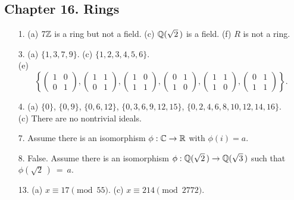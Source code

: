 \subsection*{Chapter 16. Rings}
 
{\small
\begin{itemize}
 
\item[1.]
(a) $7 {\Bbb Z}$ is a ring but not a field.
(c) ${\Bbb Q}(\sqrt{2}\, )$ is a field.
(f) $R$ is not a ring.
 
 
\item[3.]
(a) $\{1, 3, 7, 9 \}$.
(c) $\{ 1, 2, 3, 4, 5, 6 \}$. \\
(e) 
\[
\left\{
\begin{pmatrix}
1 & 0 \\
0 & 1
\end{pmatrix},
\begin{pmatrix}
1 & 1 \\
0 & 1
\end{pmatrix},
\begin{pmatrix}
1 & 0 \\
1 & 1
\end{pmatrix},
\begin{pmatrix}
0 & 1 \\
1 & 0
\end{pmatrix},
\begin{pmatrix}
1 & 1 \\
1 & 0
\end{pmatrix},
\begin{pmatrix}
0 & 1 \\
1 & 1
\end{pmatrix}
\right\}.
\]
 
 
\item[4.]
(a) $\{0 \}$, $\{0, 9 \}$, $\{0, 6, 12 \}$,
 $\{0, 3, 6, 9, 12, 15 \}$,  $\{0, 2, 4, 6, 8, 10, 12, 14, 16 \}$. \\
(c) There are no nontrivial ideals.
 
 
 
\item[7.]
Assume there is an isomorphism $\phi: {\Bbb C} \rightarrow {\Bbb R}$
with $\phi(i) = a$.
 
\item[8.]
False. Assume there is an isomorphism $\phi: {\Bbb Q}(\sqrt{2}\, )
\rightarrow {\Bbb Q}(\sqrt{3}\, )$ such that $\phi(\sqrt{2}\, )~=~a$.
 
\item[13.]
(a) $x \equiv 17 \pmod{55}$. (c) $x \equiv 214 \pmod{2772}$.
 

\end{itemize}}
